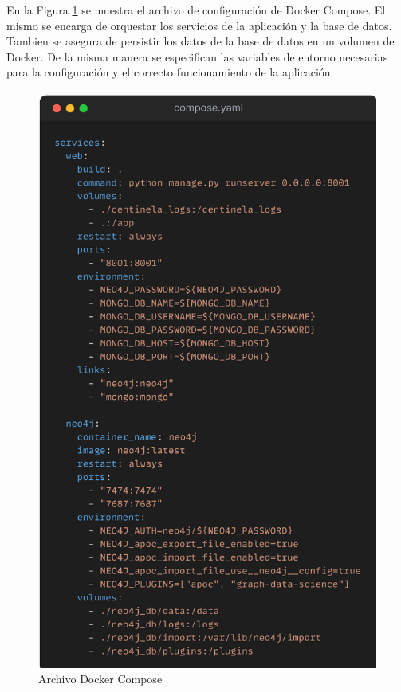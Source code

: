 En la Figura \ref{fig:docker-compose} se muestra el archivo de configuración de Docker Compose.
El mismo se encarga de orquestar los servicios de la aplicación y la base de datos. Tambien se asegura de persistir los datos de la base de datos en un volumen de Docker.
De la misma manera se especifican las variables de entorno necesarias para la configuración y el correcto funcionamiento de la aplicación.

\begin{figure}[!t]
    \centering
    \includegraphics[scale=0.12]{../02Figures/02Chapter/Sprints/Sprint-3/compose-yaml.png}
    \caption{Archivo Docker Compose}
    \label{fig:docker-compose}
\end{figure}

